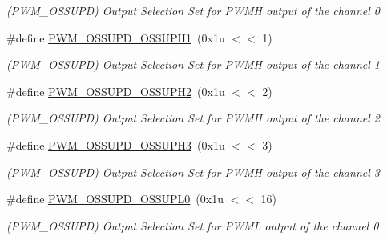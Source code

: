 \begin{DoxyCompactItemize}
\begin{DoxyCompactList}\small\item\em (P\+W\+M\+\_\+\+O\+S\+S\+U\+PD) Output Selection Set for P\+W\+MH output of the channel 0 \end{DoxyCompactList}\item 
\mbox{\label{group__SAME70__PWM_ga2fb78ee3b72236f21a37dcf5c45f6347}} 
\#define \mbox{\hyperlink{group__SAME70__PWM_ga2fb78ee3b72236f21a37dcf5c45f6347}{P\+W\+M\+\_\+\+O\+S\+S\+U\+P\+D\+\_\+\+O\+S\+S\+U\+P\+H1}}~(0x1u $<$$<$ 1)
\begin{DoxyCompactList}\small\item\em (P\+W\+M\+\_\+\+O\+S\+S\+U\+PD) Output Selection Set for P\+W\+MH output of the channel 1 \end{DoxyCompactList}\item 
\mbox{\label{group__SAME70__PWM_gabd9957d849685620c2b1386135c01bfe}} 
\#define \mbox{\hyperlink{group__SAME70__PWM_gabd9957d849685620c2b1386135c01bfe}{P\+W\+M\+\_\+\+O\+S\+S\+U\+P\+D\+\_\+\+O\+S\+S\+U\+P\+H2}}~(0x1u $<$$<$ 2)
\begin{DoxyCompactList}\small\item\em (P\+W\+M\+\_\+\+O\+S\+S\+U\+PD) Output Selection Set for P\+W\+MH output of the channel 2 \end{DoxyCompactList}\item 
\mbox{\label{group__SAME70__PWM_ga205af3b8a9ec5ffab21ef4cb55df79bf}} 
\#define \mbox{\hyperlink{group__SAME70__PWM_ga205af3b8a9ec5ffab21ef4cb55df79bf}{P\+W\+M\+\_\+\+O\+S\+S\+U\+P\+D\+\_\+\+O\+S\+S\+U\+P\+H3}}~(0x1u $<$$<$ 3)
\begin{DoxyCompactList}\small\item\em (P\+W\+M\+\_\+\+O\+S\+S\+U\+PD) Output Selection Set for P\+W\+MH output of the channel 3 \end{DoxyCompactList}\item 
\mbox{\label{group__SAME70__PWM_gac35e76bcb2b7795022e5117eec690bfc}} 
\#define \mbox{\hyperlink{group__SAME70__PWM_gac35e76bcb2b7795022e5117eec690bfc}{P\+W\+M\+\_\+\+O\+S\+S\+U\+P\+D\+\_\+\+O\+S\+S\+U\+P\+L0}}~(0x1u $<$$<$ 16)
\begin{DoxyCompactList}\small\item\em (P\+W\+M\+\_\+\+O\+S\+S\+U\+PD) Output Selection Set for P\+W\+ML output of the channel 0 \end{DoxyCompactList}\item 

\end{DoxyCompactItemize}
